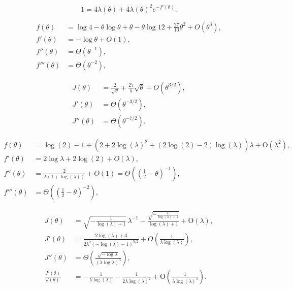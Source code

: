 \documentclass[10pt,a4paper]{amsart}
\newcommand{\bigO}[1]{O\left({#1}\right)}
\newcommand{\bigTheta}[1]{\Theta\left({#1}\right)}
\newcommand{\halfminth}{\left(\frac 1 2 -\theta\right)}
\begin{document}
\begin{equation}
    \label{eq:nicelambdaf}
    1=4\lambda(\theta)+4\lambda(\theta)^{2}e^{-f'(\theta)}.
\end{equation}

\begin{align}
    f(\theta)&=\log4-\theta\log\theta+\theta-\theta\log 12+\frac{27}{10}\theta^2+\bigO{\theta^3},\label{eq_f_as_theta_to_0}\\
    f'(\theta)&=-\log\theta+O(1),\label{eq_fprim_as_theta_to_0}\\
    f''(\theta)&=\Theta(\theta^{-1}),\label{eq_fsec_as_theta_to_0}\\
    f'''(\theta)&=\Theta(\theta^{-2}),\label{eq_fter_as_theta_to_0}
\end{align}

\begin{align}
    J(\theta)&=\frac{2}{\sqrt \theta}+\frac{27}{5}\sqrt \theta+\bigO{\theta^{3/2}}\label{eq_J_as_theta_to_0},\\
    J'(\theta)&=\Theta(\theta^{-3/2}),\label{eq_Jprim_as_theta_to_0}\\
    J''(\theta)&=\Theta(\theta^{-7/2}).\label{eq_Jsec_as_theta_to_0}
\end{align}

\begin{align}
    f(\theta)&=\log\! \left(2\right)-1+\left(2+2 \log\! \left(\lambda \right)^{2}+\left(2 \log\! \left(2\right)-2\right) \log\! \left(\lambda \right)\right) \lambda +\mathrm{O}\! \left(\lambda^{2}\right),\label{eq_f_as_theta_large}\\
    f'(\theta)&=2\log \lambda+2\log(2)+\bigO{\lambda},\label{eq_fprim_as_theta_large}\\
    f''(\theta)&=\frac{2}{\lambda(1+\log(\lambda))}+\bigO{1}=\bigTheta{\halfminth^{-1}},\label{eq_fsec_as_theta_large}\\
    f'''(\theta)&=\Theta\left(\left(\frac 1 2 -\theta \right)^{-2}\right),\label{eq_fter_as_theta_large}
    \end{align}

\begin{align}
    J(\theta)&=\sqrt{-\frac{1}{\log\! \left(\lambda \right)+1}}\, \lambda^{-1}-\frac{\sqrt{-\frac{1}{\log\left(\lambda \right)+1}}}{\log\! \left(\lambda \right)+1}+\mathrm{O}\! \left(\lambda \right),\label{eq_J_as_theta_large}\\
   J'(\theta)&=\frac{2\log(\lambda)+3}{2\lambda^{2}(-\log(\lambda)-1)^{5/2}}+\bigO{\frac{1}{\lambda\log(\lambda)}},\label{eq_Jprim_as_theta_large}\\
   J''(\theta)&=\bigTheta{\frac{\sqrt{-\log \lambda}}{(\lambda\log\lambda)^3}},\label{eq_Jsec_as_theta_large}\\
   \frac{J'(\theta)}{J(\theta)}&=-\frac{1}{\lambda\log(\lambda)}-\frac{1}{2\lambda\log(\lambda)^{2}}+\mathrm{O}\! \left(\frac{1}{\lambda\log(\lambda)^4} \right).\label{eq_Jlogprim_as_theta_large}
    \end{align}    
\end{document}
